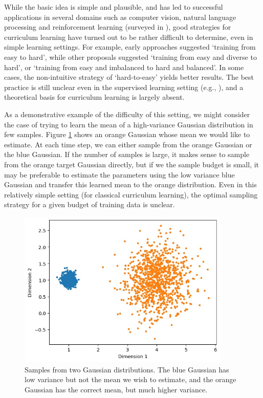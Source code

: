\documentclass{article}
\theoremstyle{definition}
\begin{document}
While the basic idea is simple and plausible, and has led to successful applications in several domains such as computer vision, natural language processing and reinforcement learning (surveyed in \citep{Narvekar2019,Soviany2021}), good strategies for curriculum learning have turned out to be rather difficult to determine, even in simple learning settings.
For example, early approaches suggested `training from easy to hard', while other proposals suggested `training from easy and diverse to hard', or `training from easy and imbalanced to hard and balanced'. In some cases, the non-intuitive strategy of `hard-to-easy' yields better results. The best practice is still unclear even in the supervised learning setting (e.g., \cite{Anonymous2021}), and a theoretical basis for curriculum learning is largely absent.

As a demonstrative example of the difficulty of this setting, we might consider the case of trying to learn the mean of a high-variance Gaussian distribution in few samples. Figure \ref{fig:cl_demo} shows an orange Gaussian whose mean we would like to estimate. At each time step, we can either sample from the orange Gaussian or the blue Gaussian. If the number of samples is large, it makes sense to sample from the orange target Gaussian directly, but if we the sample budget is small, it may be preferable to estimate the parameters using the low variance blue Gaussian and transfer this learned mean to the orange distribution. Even in this relatively simple setting (for classical curriculum learning), the optimal sampling strategy for a given budget of training data is unclear.

\begin{figure}
	\centering
	\includegraphics[width=0.9\textwidth]{cl_example.JPG}
	\caption{Samples from two Gaussian distributions. The blue Gaussian has low variance but not the mean we wish to estimate, and the orange Gaussian has the correct mean, but much higher variance.}
	\label{fig:cl_demo}
\end{figure}
\end{document}
